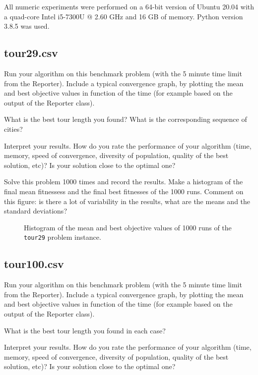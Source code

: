 \documentclass[a4paper,10pt]{article}
\newcommand{\ReplaceMe}[1]{{\color{blue}#1}}
\begin{document}
All numeric experiments were performed on a 64-bit version of Ubuntu 20.04 with a quad-core Intel i5-7300U @ 2.60 GHz and 16 GB of memory. Python version 3.8.5 was used.

\subsection{tour29.csv}

\ReplaceMe{Run your algorithm on this benchmark problem (with the 5 minute time limit from the Reporter). Include a typical convergence graph, by plotting the mean and best objective values in function of the time (for example based on the output of the Reporter class). 

What is the best tour length you found? What is the corresponding sequence of cities? 

Interpret your results. How do you rate the performance of your algorithm (time, memory, speed of convergence, diversity of population, quality of the best solution, etc)? Is your solution close to the optimal one?

Solve this problem 1000 times and record the results. Make a histogram of the final mean fitnessess and the final best fitnesses of the 1000 runs. Comment on this figure: is there a lot of variability in the results, what are the means and the standard deviations?}

\begin{figure}
\centering

\caption{Histogram of the mean and best objective values of 1000 runs of the \texttt{tour29} problem instance.}
\label{fig:graphs}
\end{figure}

\subsection{tour100.csv}

\ReplaceMe{Run your algorithm on this benchmark problem (with the 5 minute time limit from the Reporter). Include a typical convergence graph, by plotting the mean and best objective values in function of the time (for example based on the output of the Reporter class). 

What is the best tour length you found in each case? 

Interpret your results. How do you rate the performance of your algorithm (time, memory, speed of convergence, diversity of population, quality of the best solution, etc)? Is your solution close to the optimal one?}
\end{document}
